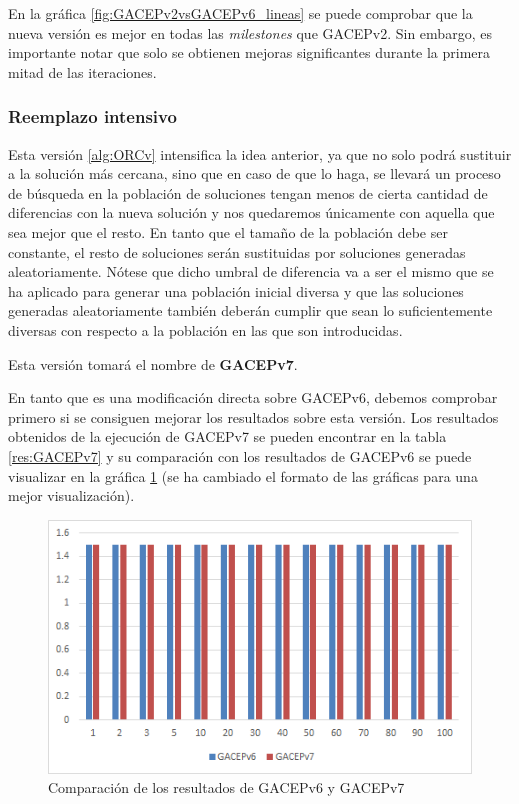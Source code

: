 En la gráfica \ref{fig:GACEPv2vsGACEPv6_lineas} se puede comprobar que la nueva versión es mejor en todas las \textit{milestones} que GACEPv2. 
Sin embargo, es importante notar que solo se obtienen mejoras significantes durante la primera mitad de las iteraciones. 


\subsubsection{Reemplazo intensivo}

Esta versión \ref{alg:ORCv} intensifica la idea anterior, ya que no solo podrá sustituir a la solución más cercana, sino que en caso de que lo haga, se llevará un proceso de búsqueda en la población de soluciones tengan menos de cierta cantidad de diferencias con la nueva solución y nos quedaremos únicamente con aquella que sea mejor que el resto. 
En tanto que el tamaño de la población debe ser constante, el resto de soluciones serán sustituidas por soluciones generadas aleatoriamente. 
Nótese que dicho umbral de diferencia va a ser el mismo que se ha aplicado para generar una población inicial diversa y que las soluciones generadas aleatoriamente también deberán cumplir que sean lo suficientemente diversas con respecto a la población en las que son introducidas. 

Esta versión tomará el nombre de \textbf{GACEPv7}. 

En tanto que es una modificación directa sobre GACEPv6, debemos comprobar primero si se consiguen mejorar los resultados sobre esta versión. 
Los resultados obtenidos de la ejecución de GACEPv7 se pueden encontrar en la tabla \ref{res:GACEPv7} y su comparación con los resultados de GACEPv6 se puede visualizar en la gráfica \ref{fig:GACEPv6vsGACEPv7} (se ha cambiado el formato de las gráficas para una mejor visualización).

\begin{figure}[h]
		\centering
		\includegraphics[scale=1]{imagenes/Experimental/barras/GACEPv6vsGACEPv7.png}
        \caption{Comparación de los resultados de GACEPv6 y GACEPv7}
        \label{fig:GACEPv6vsGACEPv7}
\end{figure}

